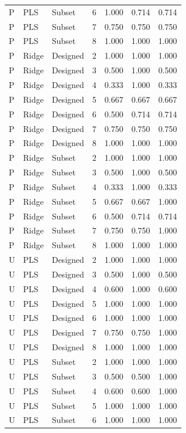 \documentclass[10pt,a4paper]{article}
\begin{document}
\begin{landscape}
\begin{longtable}{lllrrrr}
P & PLS & Subset & 6 & 1.000 & 0.714 & 0.714 \\
P & PLS & Subset & 7 & 0.750 & 0.750 & 0.750 \\
P & PLS & Subset & 8 & 1.000 & 1.000 & 1.000 \\
P & Ridge & Designed & 2 & 1.000 & 1.000 & 1.000 \\
P & Ridge & Designed & 3 & 0.500 & 1.000 & 0.500 \\
P & Ridge & Designed & 4 & 0.333 & 1.000 & 0.333 \\
P & Ridge & Designed & 5 & 0.667 & 0.667 & 0.667 \\
P & Ridge & Designed & 6 & 0.500 & 0.714 & 0.714 \\
P & Ridge & Designed & 7 & 0.750 & 0.750 & 0.750 \\
P & Ridge & Designed & 8 & 1.000 & 1.000 & 1.000 \\
P & Ridge & Subset & 2 & 1.000 & 1.000 & 1.000 \\
P & Ridge & Subset & 3 & 0.500 & 1.000 & 0.500 \\
P & Ridge & Subset & 4 & 0.333 & 1.000 & 0.333 \\
P & Ridge & Subset & 5 & 0.667 & 0.667 & 1.000 \\
P & Ridge & Subset & 6 & 0.500 & 0.714 & 0.714 \\
P & Ridge & Subset & 7 & 0.750 & 0.750 & 1.000 \\
P & Ridge & Subset & 8 & 1.000 & 1.000 & 1.000 \\
U & PLS & Designed & 2 & 1.000 & 1.000 & 1.000 \\
U & PLS & Designed & 3 & 0.500 & 1.000 & 0.500 \\
U & PLS & Designed & 4 & 0.600 & 1.000 & 0.600 \\
U & PLS & Designed & 5 & 1.000 & 1.000 & 1.000 \\
U & PLS & Designed & 6 & 1.000 & 1.000 & 1.000 \\
U & PLS & Designed & 7 & 0.750 & 0.750 & 1.000 \\
U & PLS & Designed & 8 & 1.000 & 1.000 & 1.000 \\
U & PLS & Subset & 2 & 1.000 & 1.000 & 1.000 \\
U & PLS & Subset & 3 & 0.500 & 0.500 & 1.000 \\
U & PLS & Subset & 4 & 0.600 & 0.600 & 1.000 \\
U & PLS & Subset & 5 & 1.000 & 1.000 & 1.000 \\
U & PLS & Subset & 6 & 1.000 & 1.000 & 1.000 \\

\end{longtable}
\end{landscape}
\end{document}
